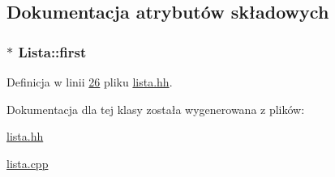 \subsection{Dokumentacja atrybutów składowych}
\hypertarget{class_lista_ae9ddc4b39562b5382a9c2559f2e4b421}{
\subsubsection[{first}]{$\ast$ Lista\-::first\hspace{0.3cm}{\ttfamily [private]}}}\label{class_lista_ae9ddc4b39562b5382a9c2559f2e4b421}


Definicja w linii \hyperlink{lista_8hh_source_l00026}{26} pliku \hyperlink{lista_8hh_source}{lista.\-hh}.



Dokumentacja dla tej klasy została wygenerowana z plików\-:\begin{DoxyCompactItemize}
\item 
\hyperlink{lista_8hh}{lista.\-hh}\item 
\hyperlink{lista_8cpp}{lista.\-cpp}\end{DoxyCompactItemize}
